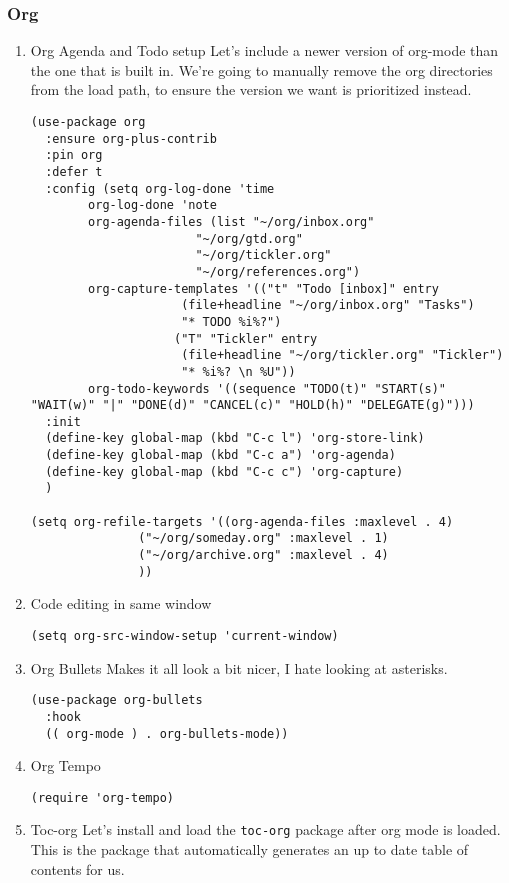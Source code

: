 \documentclass[11pt]{article}
\begin{document}
\subsubsection{Org}
\label{sec:org25362a1}

\begin{enumerate}
\item Org Agenda and Todo setup
\label{sec:org8cb6ab0}
Let's include a newer version of org-mode than the one that is built in. We're going
to manually remove the org directories from the load path, to ensure the version we
want is prioritized instead.

\begin{verbatim}
(use-package org
  :ensure org-plus-contrib
  :pin org
  :defer t
  :config (setq org-log-done 'time
		org-log-done 'note
		org-agenda-files (list "~/org/inbox.org"
				       "~/org/gtd.org" 
				       "~/org/tickler.org"
				       "~/org/references.org")
		org-capture-templates '(("t" "Todo [inbox]" entry
					 (file+headline "~/org/inbox.org" "Tasks")
					 "* TODO %i%?")
					("T" "Tickler" entry
					 (file+headline "~/org/tickler.org" "Tickler")
					 "* %i%? \n %U"))
		org-todo-keywords '((sequence "TODO(t)" "START(s)" "WAIT(w)" "|" "DONE(d)" "CANCEL(c)" "HOLD(h)" "DELEGATE(g)")))
  :init
  (define-key global-map (kbd "C-c l") 'org-store-link)
  (define-key global-map (kbd "C-c a") 'org-agenda)
  (define-key global-map (kbd "C-c c") 'org-capture)
  )

(setq org-refile-targets '((org-agenda-files :maxlevel . 4)
			   ("~/org/someday.org" :maxlevel . 1)
			   ("~/org/archive.org" :maxlevel . 4)
			   ))

\end{verbatim}

\item Code editing in same window
\label{sec:org09da323}
\begin{verbatim}
(setq org-src-window-setup 'current-window)
\end{verbatim}
\item Org Bullets
\label{sec:org3e69aaf}
Makes it all look a bit nicer, I hate looking at asterisks.
\begin{verbatim}
(use-package org-bullets
  :hook
  (( org-mode ) . org-bullets-mode))
\end{verbatim}

\item Org Tempo
\label{sec:org9a6a861}
\begin{verbatim}
(require 'org-tempo)
\end{verbatim}
\item Toc-org
\label{sec:org8dc8d72}
Let's install and load the \texttt{toc-org} package after org mode is loaded. This is the
package that automatically generates an up to date table of contents for us.


\end{enumerate}
\end{document}
